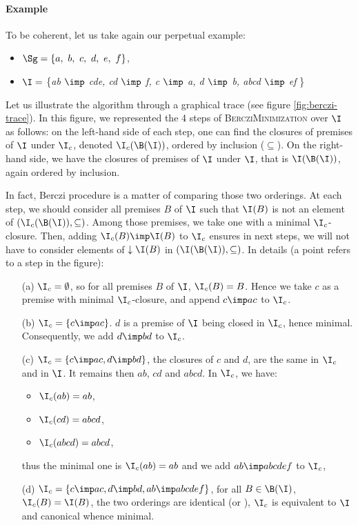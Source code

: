 \paragraph{Example} To be coherent, let us take again our perpetual example:
\begin{itemize}
	\item $\Sg = \{a, \ b, \ c, \ d, \ e, \ f \}$,
	\item $\I =$ \{\textit{ab $\imp$ cde, cd $\imp$ f, c $\imp$ a, d $\imp$ b, 
		abcd $\imp$ ef} \} 
\end{itemize}
Let us illustrate the algorithm through a graphical trace (see figure 
\ref{fig:berczi-trace}). In this figure, we represented the 4 steps of 
\textsc{BercziMinimization} over $\I$ as follows: on the left-hand side of each 
step, one can find the closures of premises of $\I$ under $\I_c$, denoted 
$\I_c(\B(\I))$, ordered by inclusion ($\subseteq$). On the right-hand side, we 
have the closures of premises of $\I$ under $\I$, that is $\I(\B(\I))$, again 
ordered by inclusion.

\vspace{1.2em}

In fact, Berczi procedure is a matter of comparing those two orderings. At each
step, we should consider all premises $B$ of $\I$ such that $\I(B)$ is not an
element of $(\I_c(\B(\I)), \subseteq)$. Among those premises, we take one with
a minimal $\I_c$-closure. Then, adding $\I_c(B) \imp \I(B)$ to $\I_c$ ensures
in next steps, we will not have to consider elements of $\downarrow \I(B)$ in
$(\I(\B(\I)), \subseteq)$. In details (a point refers to a step in the figure):
\begin{itemize}
	\item[(a)] $\I_c = \emptyset$, so for all premises $B$ of $\I$, $\I_c(B) = 
	B$.	Hence we take $c$ as a premise with minimal $\I_c$-closure, and append 
	$c \imp ac$ to $\I_c$.
	\item[(b)] $\I_c = \{ c \imp ac \}$. $d$ is a premise of $\I$ being closed 
	in $\I_c$, hence minimal. Consequently, we add $d \imp bd$ to $\I_c$.
	\item[(c)] $\I_c = \{ c \imp ac, d \imp bd \}$, the closures of $c$ and 
	$d$, are the same in $\I_c$ and in $\I$. It remains then $ab$, $cd$ and 
	$abcd$. In $\I_c$, we have:
	\begin{itemize}
		\item $\I_c(ab) = ab$,
		\item $\I_c(cd) = abcd$,
		\item $\I_c(abcd) = abcd$,
	\end{itemize}
	thus the minimal one is $\I_c(ab) = ab$ and we add $ab \imp abcdef$ to 
	$\I_c$,
	\item[(d)] $\I_c = \{ c \imp ac, d \imp bd, ab \imp abcdef 
	\}$, for all $B \in \B(\I)$, $\I_c(B) = \I(B)$, the two orderings
	are identical (or ), $\I_c$ is equivalent to $\I$ and
	canonical whence minimal.
\end{itemize}


